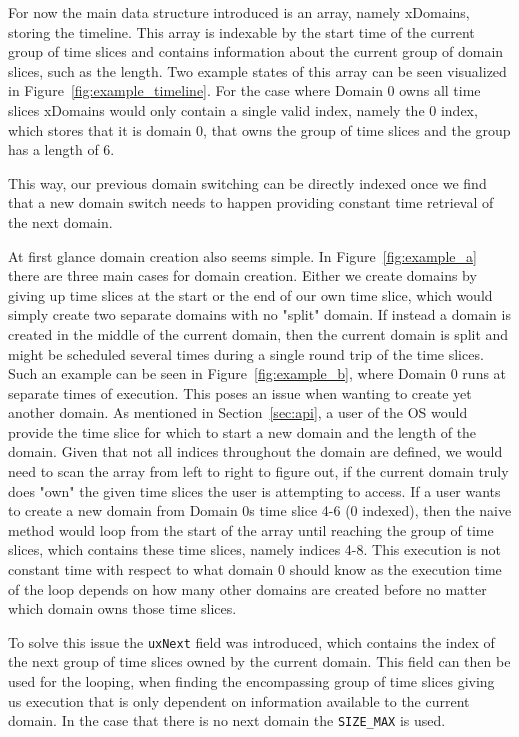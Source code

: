 For now the main data structure introduced is an array, namely xDomains,
storing the timeline. This array is indexable by the start time of the current
group of time slices and contains information about the current group of domain
slices, such as the length. Two example states of this array can be seen
visualized in Figure~\ref{fig:example_timeline}. For the case where Domain 0
owns all time slices xDomains would only contain a single valid index, namely
the 0 index, which stores that it is domain 0, that owns the group of time
slices and the group has a length of 6.

This way, our previous domain switching can be directly indexed once we find
that a new domain switch needs to happen providing constant time retrieval of
the next domain.

At first glance domain creation also seems simple. In
Figure~\ref{fig:example_a} there are three main cases for domain creation.
Either we create domains by giving up time slices at the start or the end of
our own time slice, which would simply create two separate domains with no
"split" domain. If instead a domain is created in the middle of the current
domain, then the current domain is split and might be scheduled several times
during a single round trip of the time slices. Such an example can be seen in
Figure~\ref{fig:example_b}, where Domain 0 runs at separate times of execution.
This poses an issue when wanting to create yet another domain. As mentioned in
Section~\ref{sec:api}, a user of the OS would provide the time slice for which
to start a new domain and the length of the domain. Given that not all indices
throughout the domain are defined, we would need to scan the array from left to
right to figure out, if the current domain truly does "own" the given time
slices the user is attempting to access. If a user wants to create a new domain
from Domain 0s time slice 4-6 (0 indexed), then the naive method would loop
from the start of the array until reaching the group of time slices, which
contains these time slices, namely indices 4-8. This execution is not constant
time with respect to what domain 0 should know as the execution time of the
loop depends on how many other domains are created before no matter which
domain owns those time slices.

To solve this issue the \texttt{uxNext} field was introduced, which contains
the index of the next group of time slices owned by the current domain. This
field can then be used for the looping, when finding the encompassing group of
time slices giving us execution that is only dependent on information available
to the current domain. In the case that there is no next domain the
\texttt{SIZE\_MAX} is used.

